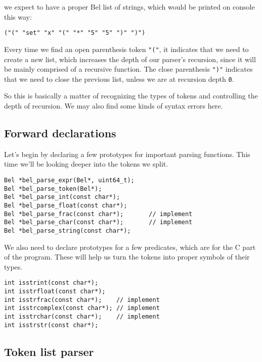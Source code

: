 \documentclass[openright,a4paper,twoside,12pt]{memoir}
\begin{document}
we expect to have a proper Bel list of strings, which would be printed
on console this way:

\begin{verbatim}
("(" "set" "x" "(" "*" "5" "5" ")" ")")
\end{verbatim}

Every time we find an open parenthesis token \texttt{"("}, it indicates that we
need to create  a new list, which increases the  depth of our parser's
recursion,  since  it   will  be  mainly  comprised   of  a  recursive
function. The  close parenthesis \texttt{")"}  indicates that we need  to close
the previous list, unless we are at recursion depth \texttt{0}.

So this is  basically a matter of recognizing the  types of tokens and
controlling the  depth of recursion.  We may  also find some  kinds of
syntax errors here.

\subsection{Forward declarations}
\label{sec:orge3f83fa}

Let's  begin  by declaring  a  few  prototypes for  important  parsing
functions. This time we'll be looking deeper into the tokens we split.

\begin{verbatim}
Bel *bel_parse_expr(Bel*, uint64_t);
Bel *bel_parse_token(Bel*);
Bel *bel_parse_int(const char*);
Bel *bel_parse_float(const char*);
Bel *bel_parse_frac(const char*);       // implement
Bel *bel_parse_char(const char*);       // implement
Bel *bel_parse_string(const char*);
\end{verbatim}

We also need to declare prototypes for a few predicates, which are for
the C  part of the  program. These will help  us turn the  tokens into
proper symbols of their types.

\begin{verbatim}
int isstrint(const char*);
int isstrfloat(const char*);
int isstrfrac(const char*);    // implement
int isstrcomplex(const char*); // implement
int isstrchar(const char*);    // implement
int isstrstr(const char*);
\end{verbatim}

\subsection{Token list parser}
\label{sec:org620dd0f}
\end{document}
